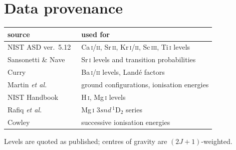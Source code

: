 \documentclass[11pt,a4paper]{article}
\theoremstyle{definition}
\begin{document}
\section{Data provenance}
\label{app:data}
\begin{center}\small
\begin{tabular}{@{}p{62mm}p{78mm}@{}}
\toprule
source & used for\\
\midrule
NIST ASD ver.\ 5.12~\cite{nistasd} & Ca\,\textsc{i/ii}, Sr\,\textsc{ii},
  Kr\,\textsc{i/ii}, Sc\,\textsc{iii}, Ti\,\textsc{i} levels\\
Sansonetti \& Nave~\cite{sansonetti} & Sr\,\textsc{i} levels and transition
  probabilities\\
Curry~\cite{curry} & Ba\,\textsc{i/ii} levels, Land\'e factors\\
Martin \emph{et al.}~\cite{srd111} & ground configurations, ionisation energies\\
NIST Handbook~\cite{handbook} & H\,\textsc{i}, Mg\,\textsc{i} levels\\
Rafiq \emph{et al.}~\cite{rafiq} & Mg\,\textsc{i} $3snd\,^1$D$_2$ series\\
Cowley~\cite{cowley} & successive ionisation energies\\
\bottomrule
\end{tabular}
\end{center}
\vspace{2mm}
Levels are quoted as published; centres of gravity are $(2J+1)$-weighted.
\end{document}
